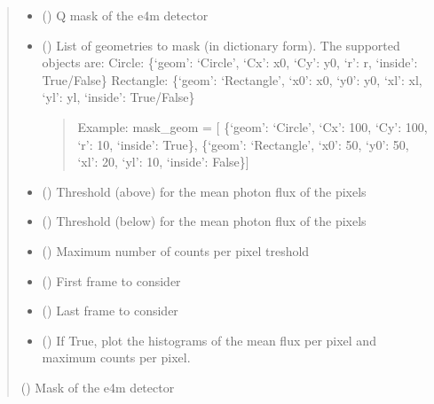 \documentclass[letterpaper,10pt,english]{sphinxmanual}
\begin{document}
\begin{fulllineitems}
\begin{quote}
\begin{description}
\begin{itemize}
\item {} 
\sphinxAtStartPar
{} () \textendash{} Q mask of the e4m detector

\item {} 
\sphinxAtStartPar
{} () \textendash{} List of geometries to mask (in dictionary form). The supported objects are:
\sphinxhyphen{} Circle: \{‘geom’: ‘Circle’, ‘Cx’: x0, ‘Cy’: y0, ‘r’: r, ‘inside’: True/False\}
\sphinxhyphen{} Rectangle: \{‘geom’: ‘Rectangle’, ‘x0’: x0, ‘y0’: y0, ‘xl’: xl, ‘yl’: yl, ‘inside’: True/False\}
\begin{quote}

\sphinxAtStartPar
Example:
mask\_geom = {[}   \{‘geom’: ‘Circle’, ‘Cx’: 100, ‘Cy’: 100, ‘r’: 10, ‘inside’: True\}, \{‘geom’: ‘Rectangle’, ‘x0’: 50, ‘y0’: 50, ‘xl’: 20, ‘yl’: 10, ‘inside’: False\}{]}
\end{quote}

\item {} 
\sphinxAtStartPar
{} () \textendash{} Threshold (above) for the mean photon flux of the pixels

\item {} 
\sphinxAtStartPar
{} () \textendash{} Threshold (below) for the mean photon flux of the pixels

\item {} 
\sphinxAtStartPar
{} () \textendash{} Maximum number of counts per pixel treshold

\item {} 
\sphinxAtStartPar
{} () \textendash{} First frame to consider

\item {} 
\sphinxAtStartPar
{} () \textendash{} Last frame to consider

\item {} 
\sphinxAtStartPar
{} () \textendash{} If True, plot the histograms of the mean flux per pixel and maximum counts per pixel.

\end{itemize}

\sphinxAtStartPar
{} () \textendash{} Mask of the e4m detector

\end{description}\end{quote}

\end{fulllineitems}
\end{document}
